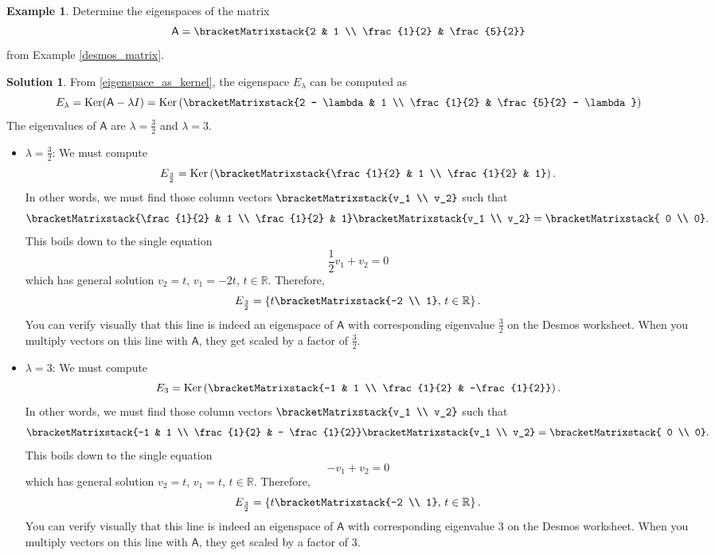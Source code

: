 \documentclass[a4paper,11pt]{book}
\theoremstyle{definition}
\newtheorem{example_environment}{Example}[chapter]
\newtheorem*{solution}{Solution}
\newcommand{\mat}[1]{\mathsf{#1}}
\newcommand{\cmatrix}[1]{\bracketMatrixstack{#1}}
\newenvironment{example}
	{
		\begin{oframed} 
		\begin{example_environment}
	}
	{
		\end{example_environment}
		\end{oframed}
	}
\DeclareMathOperator{\Ker}{Ker}
\begin{document}
\begin{example} \label{eigvectors_desmos_matrix} Determine the eigenspaces of the matrix 
\[
\mat{A} = \cmatrix{2 & 1 \\ \frac{1}{2} & \frac{5}{2}}
\]
from Example \ref{desmos_matrix}.

\begin{solution}
From \eqref{eigenspace_as_kernel}, the eigenspace $E_\lambda$ can be computed as
\[
  E_\lambda = \Ker (\mat{A} - \lambda I) = \Ker \left( \cmatrix{2 - \lambda & 1 \\ \frac{1}{2} & \frac{5}{2} - \lambda} \right)
\]
The eigenvalues of $\mat{A}$ are $\lambda = \frac{3}{2}$ and $\lambda = 3$.

\begin{itemize}

\item $\lambda = \frac{3}{2}$:
We must compute
\[
 E_{\frac{3}{2}} = \Ker \left( \cmatrix{\frac{1}{2} & 1 \\ \frac{1}{2} & 1} \right).
\]
In other words, we must find those column vectors $\cmatrix{v_1 \\ v_2}$ such that
\[
\cmatrix{\frac{1}{2} & 1 \\ \frac{1}{2} & 1} \cmatrix{v_1 \\ v_2} = \cmatrix{ 0 \\ 0}.
\]
This boils down to the single equation
\[
 \frac{1}{2}v_1 + v_2 = 0
\]
which has general solution $v_2 = t$, $v_1 = -2t$, $t \in \mathbb{R}$. Therefore,
\[
 E_{\frac{3}{2}} = \left\{ t \cmatrix{-2 \\ 1}, \, t \in \mathbb{R} \right\}.
\]
You can verify visually that this line is indeed an eigenspace of $\mat{A}$ with corresponding eigenvalue $\frac{3}{2}$ on the Desmos worksheet. When you multiply vectors on this line with $\mat{A}$, they get scaled by a factor of $\frac{3}{2}$.

\item $\lambda = 3$:
We must compute
\[
 E_3 = \Ker \left( \cmatrix{-1 & 1 \\ \frac{1}{2} & -\frac{1}{2}} \right).
\]
In other words, we must find those column vectors $\cmatrix{v_1 \\ v_2}$ such that
\[
\cmatrix{-1 & 1 \\ \frac{1}{2} & - \frac{1}{2}} \cmatrix{v_1 \\ v_2} = \cmatrix{ 0 \\ 0}.
\]
This boils down to the single equation
\[
 -v_1 + v_2 = 0
\]
which has general solution $v_2 = t$, $v_1 = t$, $t \in \mathbb{R}$. Therefore,
\[
 E_{\frac{3}{2}} = \left\{ t \cmatrix{-2 \\ 1}, \, t \in \mathbb{R} \right\}.
\]
You can verify visually that this line is indeed an eigenspace of $\mat{A}$ with corresponding eigenvalue $3$ on the Desmos worksheet. When you multiply vectors on this line with $\mat{A}$, they get scaled by a factor of $3$.

\end{itemize} 
\end{solution}
\end{example}
\end{document}

